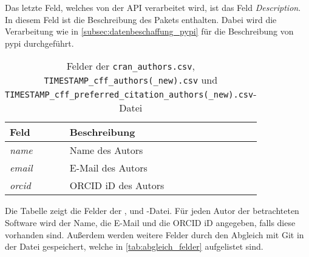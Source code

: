 Das letzte Feld, welches von der API verarbeitet wird, ist das Feld \emph{Description}.
In diesem Feld ist die Beschreibung des Pakets enthalten.
Dabei wird die Verarbeitung wie in \autoref{subsec:datenbeschaffung_pypi} für die Beschreibung von \gls{pypi} durchgeführt.

\begin{table}
    \begin{tabularx}{\textwidth}{XL{10.2cm}}
        \toprule
        \textbf{Feld} & \textbf{Beschreibung} \\ \midrule
        \emph{name}   & Name des Autors       \\
        \emph{email}  & E-Mail des Autors     \\
        \emph{orcid}  & ORCID iD des Autors   \\
        \bottomrule
    \end{tabularx}
    \caption{Felder der \texttt{cran\_authors.csv}, \texttt{TIMESTAMP\_cff\_authors(\_new).csv} und \texttt{TIMESTAMP\_cff\_preferred\_citation\_authors(\_new).csv}-Datei}
    \label{tab:cran_authors}
    \small
    Die Tabelle zeigt die Felder der ,  und -Datei. Für jeden Autor der betrachteten Software wird der Name, die E-Mail und die ORCID iD angegeben, falls diese vorhanden sind. Außerdem werden weitere Felder durch den Abgleich mit Git in der Datei gespeichert, welche in \autoref{tab:abgleich_felder} aufgelistet sind.
\end{table}
